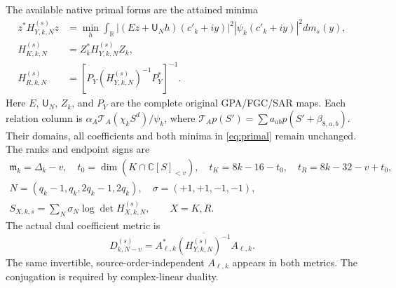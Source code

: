 \documentclass[11pt,a4paper]{article}
\newcommand{\R}{\mathbb R}
\newcommand{\C}{\mathbb C}
\begin{document}
The available native primal forms are the attained minima
\begin{equation}
\begin{split}
 z^*H_{Y,k,N}^{(s)}z
 &=\min_h\int_{\R}|(Ez+\mathsf U_Nh)(c'_k+iy)|^2
                   |\psi_k(c'_k+iy)|^2dm_s(y),\\
 H_{K,k,N}^{(s)}&=Z_k^*H_{Y,k,N}^{(s)}Z_k,\\
 H_{R,k,N}^{(s)}&=[P_Y(H_{Y,k,N}^{(s)})^{-1}P_Y^*]^{-1}.
\end{split}\label{eq:primal}
\end{equation}
Here $E$, $\mathsf U_N$, $Z_k$, and $P_Y$ are the complete original GPA/FGC/SAR maps. Each relation column is $\alpha_A\mathcal T_A(\chi_k S^d)/\psi_k$, where $\mathcal T_Ap(S')=\sum a_{ab}p(S'+\beta_{8,a,b})$. Their domains, all coefficients and both minima in \eqref{eq:primal} remain unchanged.
The ranks and endpoint signs are
\begin{equation}
\begin{gathered}
 \mathfrak m_k=\Delta_k-v,\quad t_0=\dim(K\cap\C[S]_{<v}),\quad
 t_K=8k-16-t_0,\quad t_R=8k-32-v+t_0,\\
 N=(q_k-1,q_k,2q_k-1,2q_k),\quad \sigma=(+1,+1,-1,-1),\\
 S_{X,k,s}=\sum_N\sigma_N\log\det H_{X,k,N}^{(s)},\qquad X=K,R.
\end{gathered}\label{eq:alloc}
\end{equation}
The actual dual coefficient metric is
\begin{equation}
 D_{k,N-v}^{(s)}=A_{\ell,k}^*\overline{(H_{Y,k,N}^{(s)})^{-1}}A_{\ell,k}.
 \label{eq:dual}
\end{equation}
The same invertible, source-order-independent $A_{\ell,k}$ appears in both metrics. The conjugation is required by complex-linear duality.
\end{document}
